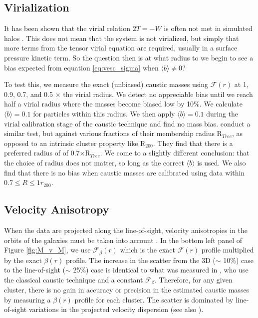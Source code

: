 \documentclass[iop]{emulateapj}
\begin{document}
\subsection{Virialization}
\label{sec:test_virialization}
    It has been shown that the virial relation $2T = -W$ is often not met in simulated halos \citep{Shaw06,Bett07,Neto07,Davis11}. This does not mean that the system is not virialized, but simply that more terms from the tensor virial equation are required, usually in a surface pressure kinetic term. So the question then is at what radius to we begin to see a bias expected from equation \ref{eq:vesc_sigma} when $\langle b \rangle \ne 0$?
        
    To test this, we measure the exact (unbiased) caustic masses using $\mathcal{F} (r)$ at 1, 0.9, 0.7, and 0.5 $\times$ the virial radius. We detect no appreciable bias until we reach half a virial radius where the masses become biased low by 10\%.  We calculate $\langle b \rangle = 0.1$ for particles within this radius. We then apply $\langle b \rangle = 0.1$ during the virial calibration stage of the caustic technique and find no mass bias. \citet{Serra11} conduct a similar test, but against various fractions of their membership radius R$_{Tree}$, as opposed to an intrinsic cluster property like R$_{200}$. They find that there is a preferred radius of of 0.7$\times$R$_{Tree}$. We come to a slightly different conclusion: that the choice of radius does not matter, so long as the correct  $\langle b \rangle$ is used. We also find that there is no bias when caustic masses are calibrated using data within $0.7 \le R  \le 1 r_{200}$.
        
\subsection{Velocity Anisotropy}\label{sec:Projection}

    When the data are projected along the line-of-sight, velocity anisotropies in the orbits of the galaxies must be taken into account \citep{Diaferio97,Gifford13a}.  In the bottom left panel of  Figure \ref{fig:M_v_M}, we use $\mathcal{F}_{\beta}(r)$ which is the exact $\mathcal{F}(r)$ profile multiplied by the exact $\beta (r)$ profile. The increase in the scatter from the 3D ($\sim$ 10\%) case to the line-of-sight ($\sim$ 25\%) case is identical to what was measured in , who use the classical caustic technique and a constant $\mathcal{F}_{\beta}$. Therefore, for any given cluster, there is no gain in accuracy or precision in the estimated caustic masses by measuring a $\beta (r)$ profile for each cluster. The scatter is dominated by line-of-sight variations in the projected velocity dispersion (see also ).
 
\end{document}
